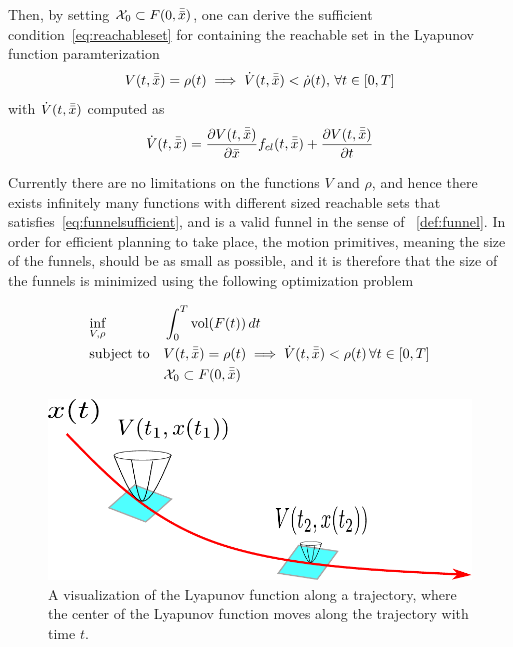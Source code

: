 Then, by setting \(\mathcal{X}_0 \subset F(0,\bar{\bar{x}})\), one can derive the
sufficient condition~\cref{eq:reachableset} for containing the reachable set in
the Lyapunov function paramterization
\begin{equation}
  \label{eq:funnelsufficient}
  V(t,\bar{\bar{x}}) = \rho(t) \implies \dot{V}(t,\bar{\bar{x}}) < \dot{\rho}(t), \, \forall t \in [0,T]
\end{equation}
with \(\dot{V}(t,\bar{\bar{x}})\) computed as
\begin{equation}
  \dot{V}(t,\bar{\bar{x}}) = \frac{\partial V(t,\bar{\bar{x}})}{\partial \bar{x}} f_{cl}(t,\bar{\bar{x}}) + \frac{\partial V(t,\bar{\bar{x}})}{\partial t}
\end{equation}

Currently there are no limitations on the functions \(V\) and \(\rho\), and
hence there exists infinitely many functions with different sized reachable sets
that satisfies~\cref{eq:funnelsufficient}, and is a valid funnel in the sense of
~\cref{def:funnel}. In order for efficient planning to take place, the motion
primitives, meaning the size of the funnels, should be as small as possible, and
it is therefore that the size of the funnels is minimized using the following
optimization problem~\cite{majumdarFunnelLibrariesRealtime2017}

\begin{align}
  \label{eq:funneloptimizationproblem}
  &\underset{V,\rho}{\text{inf}} \; &&\int_{0}^{T} \operatorname{vol}(F(t))\, dt \\
  &\text{subject to} && V(t,\bar{\bar{x}}) = \rho (t) \implies \dot{V}(t,\bar{\bar{x}}) < \rho (t) \, \forall t \in [0,T] \\
  && &\mathcal{X}_0 \subset F(0,\bar{\bar{x}}) \\
\end{align} 

\begin{figure}
  \centering
  \includegraphics{figures/experiments/lyapunov_visualization}
  \caption{A visualization of the Lyapunov function along a trajectory, where
    the center of the Lyapunov function moves along the trajectory with time
    \(t\).}
\end{figure} 


